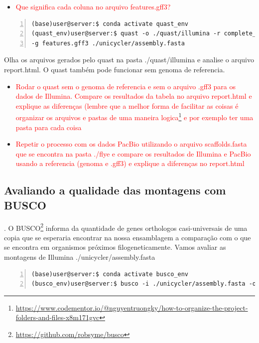 \documentclass[letter,11pt]{book}
\begin{document}
\begin{itemize}
\item \textcolor{red}{Que significa cada coluna no arquivo features.gff3?}
\end{itemize}

\begin{Verbatim}[commandchars=!\{\}, numbers=left,label= QUAST,frame=topline,fontsize=\scriptsize]
(base)user@server:$ conda activate quast_env
(quast_env)user@server:$ quast -o ./quast/illumina -r complete_genoma.fasta /
-g features.gff3 ./unicycler/assembly.fasta
\end{Verbatim}

Olha os arquivos gerados pelo quast na pasta ./quast/illumina e analise o arquivo report.html.
O quast também pode funcionar sem genoma de referencia.

\begin{itemize}
\item \textcolor{red}{Rodar o quast sem o genoma de referencia  e sem o arquivo .gff3 para os dados de Illumina. Compare os resultados da tabela no arquivo report.html e explique as diferenças} \textcolor{red} {(lembre que a melhor forma de  facilitar as coisas é organizar os arquivos e pastas de uma maneira logica\footnote{\url{https://www.codementor.io/@nguyentruongky/how-to-organize-the-project-folders-and-files-x8m171gvc}}  e por exemplo ter uma pasta para cada coisa}
\item \textcolor{red}{Repetir o processo com os dados PacBio utilizando o arquivo scaffolds.fasta que se encontra na pasta ./flye e compare os resultados de Illumina e PacBio usando a referencia (genoma e .gff3) e explique a diferenças no report.html}
\end{itemize}

\subsection{Avaliando a qualidade das montagens com BUSCO}.
O BUSCO\footnote{\url{https://github.com/robsyme/busco}} informa da quantidade de genes orthologos casi-universais de uma copia que se esperaria encontrar na nossa ensamblagem a comparação com o que se encontra em organismos próximos filogeneticamente.
Vamos avaliar as montagens de Illumina ./unicycler/assembly.fasta

\begin{Verbatim}[commandchars=!\{\}, numbers=left,label= BUSCO para dados Illumina,frame=topline,fontsize=\scriptsize]
(base)user@server:$ conda activate busco_env
(busco_env)user@server:$ busco -i ./unicycler/assembly.fasta -o illumina -m geno --lineage x --out_path ./busco
\end{Verbatim}
\end{document}
